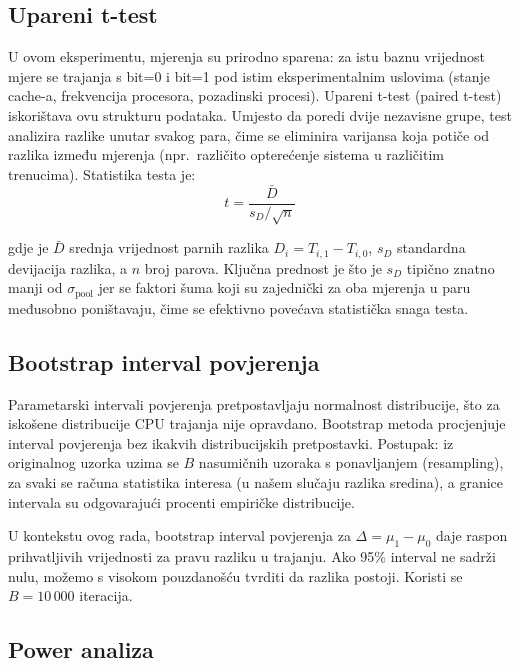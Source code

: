 \subsection{Upareni t-test}

U ovom eksperimentu, mjerenja su prirodno sparena: za istu baznu vrijednost mjere se trajanja s bit=0 i bit=1 pod istim eksperimentalnim uslovima (stanje cache-a, frekvencija procesora, pozadinski procesi). Upareni t-test (paired t-test) iskorištava ovu strukturu podataka. Umjesto da poredi dvije nezavisne grupe, test analizira razlike unutar svakog para, čime se eliminira varijansa koja potiče od razlika između mjerenja (npr.\ različito opterećenje sistema u različitim trenucima). Statistika testa je:
\begin{equation}
t = \frac{\bar{D}}{s_D / \sqrt{n}}
\label{eq:paired_t}
\end{equation}

\noindent gdje je $\bar{D}$ srednja vrijednost parnih razlika $D_i = T_{i,1} - T_{i,0}$, $s_D$ standardna devijacija razlika, a $n$ broj parova. Ključna prednost je što je $s_D$ tipično znatno manji od $\sigma_{\text{pool}}$ jer se faktori šuma koji su zajednički za oba mjerenja u paru međusobno poništavaju, čime se efektivno povećava statistička snaga testa.

\subsection{Bootstrap interval povjerenja}

Parametarski intervali povjerenja pretpostavljaju normalnost distribucije, što za iskošene distribucije CPU trajanja nije opravdano. Bootstrap metoda \cite{efron1979} procjenjuje interval povjerenja bez ikakvih distribucijskih pretpostavki. Postupak: iz originalnog uzorka uzima se $B$ nasumičnih uzoraka s ponavljanjem (resampling), za svaki se računa statistika interesa (u našem slučaju razlika sredina), a granice intervala su odgovarajući procenti empiričke distribucije.

U kontekstu ovog rada, bootstrap interval povjerenja za $\Delta = \mu_1 - \mu_0$ daje raspon prihvatljivih vrijednosti za pravu razliku u trajanju. Ako 95\% interval ne sadrži nulu, možemo s visokom pouzdanošću tvrditi da razlika postoji. Koristi se $B = 10\,000$ iteracija.

\subsection{Power analiza}

